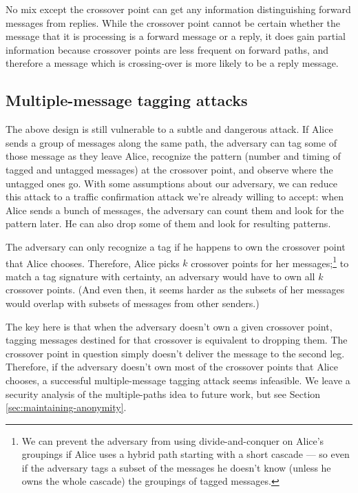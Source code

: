 \documentclass[final]{ieee}
\begin{document}
No mix except the crossover point can get any information distinguishing
forward messages from replies. While the crossover point cannot be
certain whether the message that it is processing is a forward message
or a reply, it does gain partial information because crossover points
are less frequent on forward paths, and therefore a message which is
crossing-over is more likely to be a reply message.

\subsection{Multiple-message tagging attacks}
\label{subsec:multi-tagging}

The above design is still vulnerable to a subtle and dangerous
attack. If Alice sends a group of messages along the same path, the
adversary can tag some of those message as they leave Alice, recognize
the pattern (number and timing of tagged and untagged messages) at the
crossover point, and observe where the untagged ones go.
With some assumptions about our adversary, we can reduce
this attack to a traffic confirmation attack we're already willing to
accept: when Alice sends a bunch of messages, the adversary can count
them and look for the pattern later. He can also drop some of them and
look for resulting patterns.

The adversary can only recognize a tag if he happens to own the crossover
point that Alice chooses.
Therefore, Alice picks $k$ crossover points for her
messages;\footnote{
  We can prevent the adversary from using divide-and-conquer on Alice's
  groupings if Alice uses a hybrid path starting with a short cascade ---
  so even if the adversary tags a subset of the messages he doesn't know
  (unless he owns the whole cascade) the groupings of tagged messages.
}
to match a tag signature with certainty, an adversary would
have to own all $k$ crossover points.  (And even then, it seems harder
as the subsets of her messages would overlap with subsets of
messages from other senders.)


The key here is that when the adversary doesn't own a given crossover
point, tagging messages destined for that crossover is equivalent to
dropping them.  The crossover point in question simply doesn't deliver
the message to the second leg. Therefore, if the adversary doesn't own
most of the crossover points that Alice chooses, a successful
multiple-message tagging attack seems infeasible.  We leave a security
analysis of the multiple-paths idea to future work, but see
Section \ref{sec:maintaining-anonymity}.
\end{document}
